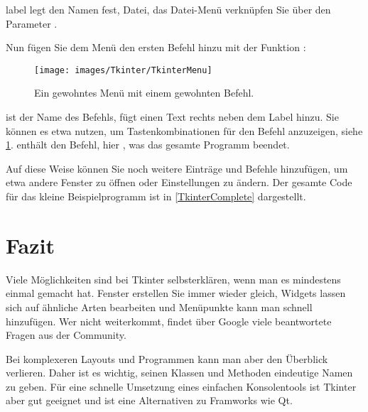 
\medskip

label legt den Namen fest, Datei, das Datei-Menü verknüpfen Sie über den Parameter .

Nun fügen Sie dem Menü den ersten Befehl hinzu mit der Funktion :

\medskip



\medskip

\begin{figure}
    \texttt{[image: images/Tkinter/TkinterMenu]}
    \caption{Ein gewohntes Menü mit einem gewohnten Befehl.} \label{TkinterMenu}
\end{figure}

 ist der Name des Befehls,  fügt einen Text rechts neben dem Label hinzu. Sie können es etwa nutzen, um Tastenkombinationen für den Befehl anzuzeigen, siehe \ref{TkinterMenu}.  enthält den Befehl, hier , was das gesamte Programm beendet.

Auf diese Weise können Sie noch weitere Einträge und Befehle hinzufügen, um etwa andere Fenster zu öffnen oder Einstellungen zu ändern. Der gesamte Code für das kleine Beispielprogramm ist in \ref{TkinterComplete} dargestellt.

\begin{code}
     
    \caption{Klasse }\label{TkinterComplete}
\end{code}   

\section{Fazit}

Viele Möglichkeiten sind bei Tkinter selbsterklären, wenn man es mindestens einmal gemacht hat. Fenster erstellen Sie immer wieder gleich, Widgets lassen sich auf ähnliche Arten bearbeiten und Menüpunkte kann man schnell hinzufügen. Wer nicht weiterkommt, findet über Google viele beantwortete Fragen aus der Community.

Bei komplexeren Layouts und Programmen kann man aber den Überblick verlieren. Daher ist es wichtig, seinen Klassen und Methoden eindeutige Namen zu geben. Für eine schnelle Umsetzung eines einfachen Konsolentools ist Tkinter aber gut geeignet und ist eine Alternativen zu Framworks wie Qt.